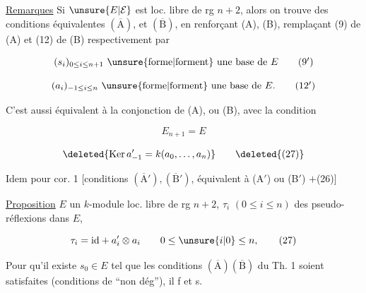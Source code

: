 
\uline{Remarques} Si $\unsure{E|\mathcal E}$ est loc. libre de rg $n+2$, alors on trouve des conditions équivalentes $(\overline{\mathrm A})$,  et $(\overline{\mathrm B})$, en renforçant (A), (B), remplaçant (9) de (A) et (12) de (B) respectivement par

\[(s_i)_{0\leq i\leq n+1}\text{ \unsure{forme|forment} une base de }E\tag*{(9$'$)}\]

\[(a_i)_{-1\leq i\leq n}\text{ \unsure{forme|forment} une base de }E.\tag*{(12$'$)}\]

 C'est aussi équivalent à la conjonction de (A), ou (B), avec la condition

\[E_{n+1}=E\tag*{(26)}\]

 

\[\deleted{\operatorname{Ker}a'_{-1}=k(a_0,\ldots,a_n)}\tag*{\deleted{(27)}}\]


Idem pour cor. 1 [conditions $(\overline{\mathrm A}'),(\overline{\mathrm B}')$, équivalent à (A$'$) ou (B$'$) $+{}$(26)]

\uline{Proposition}  $E$ un $k$-module loc. libre de rg $n+2$, $\tau_i$ $(0\leq i\leq n)$ des pseudo-réflexions dans $E$,

\[\tau_i=\mathrm{id}+a'_i\otimes a_i\qquad 0\leq\unsure{i|0}\leq n,\tag*{(27)}\]


Pour qu'il existe   $s_0\in E$ tel que les conditions $(\overline{\mathrm A})(\overline{\mathrm B})$ du Th. 1  soient satisfaites (conditions  de ``non dég''), il f et s.

